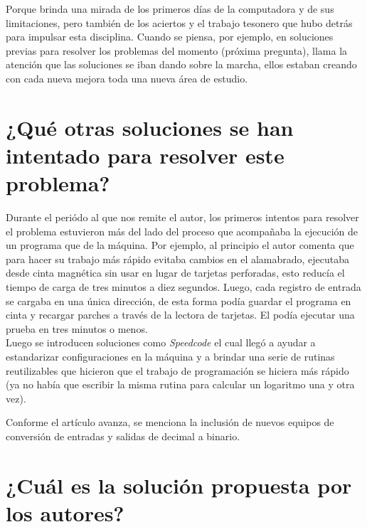 Porque brinda una mirada de los primeros días de la computadora y de sus limitaciones, pero también de los aciertos y el trabajo tesonero que hubo detrás para impulsar esta disciplina. Cuando se piensa, por ejemplo, en soluciones previas para resolver los problemas del momento (próxima pregunta), llama la atención que las soluciones se iban dando sobre la marcha, ellos estaban creando con cada nueva mejora toda una nueva área de estudio. 

\section{¿Qué otras soluciones se han intentado para resolver este problema?}

Durante el periódo al que nos remite el autor, los primeros intentos para resolver el problema estuvieron más del lado del proceso que acompañaba la ejecución de un programa que de la máquina. Por ejemplo, al principio el autor comenta que para hacer su trabajo más rápido evitaba cambios en el alamabrado, ejecutaba desde cinta magnética sin usar en lugar de tarjetas perforadas, esto reducía el tiempo de carga de tres minutos a diez segundos. Luego, cada registro de entrada se cargaba en una única dirección, de esta forma podía guardar el programa en cinta y recargar parches a través de la lectora de tarjetas. El podía ejecutar una prueba en tres minutos o menos.\\

Luego se introducen soluciones como \textit{Speedcode} el cual llegó a ayudar a estandarizar configuraciones en la máquina y a brindar una serie de rutinas reutilizables que hicieron que el trabajo de programación se hiciera más rápido (ya no había que escribir la misma rutina para calcular un logaritmo una y otra vez).

Conforme el artículo avanza, se menciona la inclusión de nuevos equipos de conversión de entradas y salidas de decimal a binario.
     

\section{¿Cuál es la solución propuesta por los autores?}


